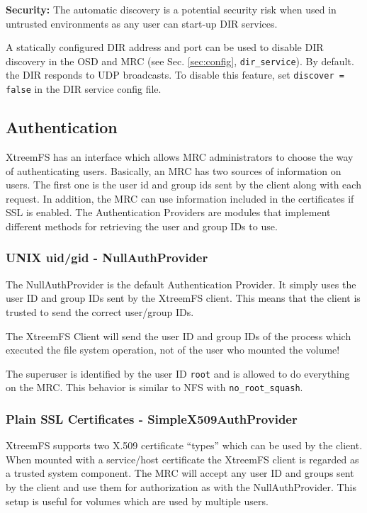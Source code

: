 \documentclass[a4paper,10pt]{book}
\begin{document}
\textbf{Security:} The automatic discovery is a potential security risk when used in untrusted environments as any user can start-up DIR services.

A statically configured DIR address and port can be used to disable DIR discovery in the OSD and MRC (see Sec. \ref{sec:config}, \texttt{dir\_service}). By default. the DIR responds to UDP broadcasts. To disable this feature, set  \texttt{discover = false} in the DIR service config file.

\subsection{Authentication}
\label{sec:AuthProvider}
XtreemFS has an interface which allows MRC administrators to choose the way of authenticating users. Basically, an MRC has two sources of information on users. The first one is the user id and group ids sent by the client along with each request. In addition, the MRC can use information included in the certificates if SSL is enabled. The Authentication Providers are modules that implement different methods for retrieving the user and group IDs to use.

\subsubsection{UNIX uid/gid - NullAuthProvider}

The NullAuthProvider is the default Authentication Provider. It simply uses the user ID and group IDs sent by the XtreemFS client. This means that the client is trusted to send the correct user/group IDs.

The XtreemFS Client will send the user ID and group IDs of the process which executed the file system operation, not of the user who mounted the volume!

The superuser is identified by the user ID \texttt{root} and is allowed to do everything on the MRC. This behavior is similar to NFS with \texttt{no\_root\_squash}.

\subsubsection{Plain SSL Certificates - SimpleX509AuthProvider}

XtreemFS supports two X.509 certificate ``types'' which can be used by the client. When mounted with a service/host certificate the XtreemFS client is regarded as a trusted system component. The MRC will accept any user ID and groups sent by the client and use them for authorization as with the NullAuthProvider. This setup is useful for volumes which are used by multiple users.
\end{document}
